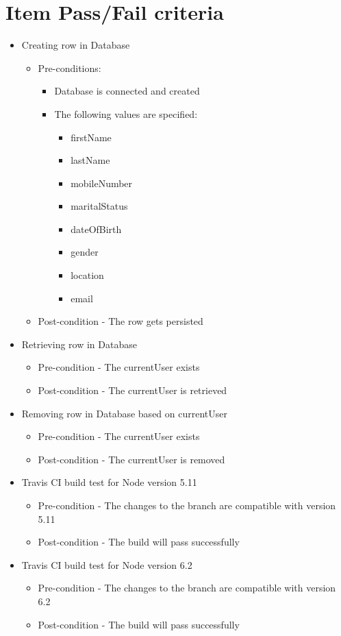 \documentclass{article}
\begin{document}
\section{Item Pass/Fail criteria}\label{sec:FailPass}
\begin{itemize}
\item Creating row in Database
\begin{itemize}
	\item Pre-conditions:
		\begin{itemize}
		\item Database is connected and created
		\item The following values are specified:  
		\begin{itemize}
		\item firstName
  		\item lastName
  		\item mobileNumber 
  		\item maritalStatus 
  		\item dateOfBirth 
 		\item gender
  		\item location 
 		\item email
 		\end{itemize} 
		\end{itemize}
\item Post-condition - The row gets persisted
\end{itemize}
\item Retrieving row in Database
	\begin{itemize}
	\item Pre-condition - The currentUser exists
	\item Post-condition - The currentUser is retrieved 
	\end{itemize}

\item Removing row in Database based on currentUser 
	\begin{itemize}
	\item Pre-condition - The currentUser exists
	\item Post-condition - The currentUser is removed
	\end{itemize}

\item Travis CI build test for Node version 5.11
	\begin{itemize}
	\item Pre-condition - The changes to the branch are compatible with version 5.11
	\item Post-condition - The build will pass successfully 
	\end{itemize}	
	
\item Travis CI build test for Node version 6.2
	\begin{itemize}
	\item Pre-condition - The changes to the branch are compatible with version 6.2
	\item Post-condition - The build will pass successfully 
\end{itemize}
\end{itemize}
\end{document}
